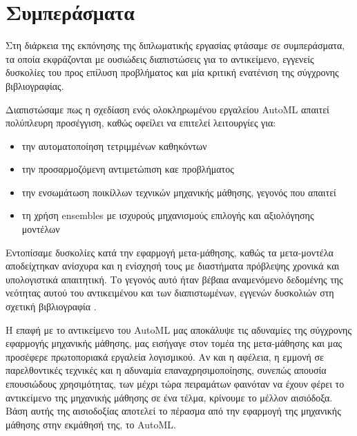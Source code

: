 \chapter{Συμπεράσματα}
Στη διάρκεια της εκπόνησης της διπλωματικής εργασίας φτάσαμε σε συμπεράσματα, τα οποία εκφράζονται με ουσιώδεις διαπιστώσεις για το αντικείμενο, εγγενείς δυσκολίες του προς επίλυση προβλήματος και μία κριτική ενατένιση της σύγχρονης βιβλιογραφίας.

Διαπιστώσαμε πως η σχεδίαση ενός ολοκληρωμένου εργαλείου \gls{AutoML} απαιτεί πολύπλευρη προσέγγιση, καθώς οφείλει να επιτελεί λειτουργίες για:
\begin{itemize}
	\item την αυτοματοποίηση τετριμμένων καθηκόντων
	\item την προσαρμοζόμενη αντιμετώπιση καε προβλήματος
	\item την ενσωμάτωση ποικίλλων τεχνικών μηχανικής μάθησης, γεγονός που απαιτεί 
	\item τη χρήση ensembles με ισχυρούς μηχανισμούς επιλογής και αξιολόγησης μοντέλων
\end{itemize}

Εντοπίσαμε δυσκολίες κατά την εφαρμογή μετα-μάθησης, καθώς τα μετα-μοντέλα αποδείχτηκαν ανίσχυρα και η ενίσχησή τους με διαστήματα πρόβλεψης χρονικά και υπολογιστικά απαιτητική. Το γεγονός αυτό ήταν βέβαια αναμενόμενο δεδομένης της νεότητας αυτού του αντικειμένου και των διαπιστωμένων, εγγενών δυσκολιών στη σχετική βιβλιογραφία \citep{Feurer:2014:UMI:3015544.3015549, kuba2002exploiting, Soares2004}.

Η επαφή με το αντικείμενο του \gls{AutoML} μας αποκάλυψε τις αδυναμίες της σύγχρονης εφαρμογής μηχανικής μάθησης, μας εισήγαγε στον τομέα της μετα-μάθησης και μας προσέφερε πρωτοποριακά εργαλεία λογισμικού. Αν και η αφέλεια, η εμμονή σε παρελθοντικές τεχνικές και η αδυναμία επαναχρησιμοποίησης, συνεπώς απουσία επουσιώδους χρησιμότητας, των μέχρι τώρα πειραμάτων φαινόταν να έχουν φέρει το αντικείμενο της μηχανικής μάθησης σε ένα τέλμα, κρίνουμε το μέλλον αισιόδοξα. Βάση αυτής της αισιοδοξίας αποτελεί το πέρασμα από την εφαρμογή της μηχανικής μάθησης στην εκμάθησή της, το \gls{AutoML}.